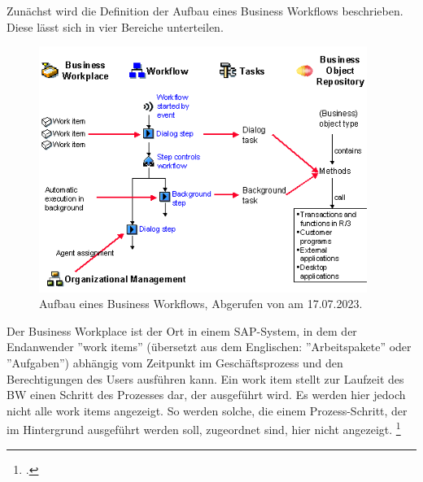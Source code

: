 Zunächst wird die Definition der Aufbau eines Business Workflows beschrieben. Diese lässt sich in vier Bereiche unterteilen.

\begin{figure}[H]
    \centering
    \includegraphics[height=8cm]{Bilder/Business-Workflows_Schema.png}
    \caption[Aufbau eines Business Workflows]{Aufbau eines Business Workflows, Abgerufen von \cite{sap_business-workflows_2022-1} am 17.07.2023.}
    \label{fig:iso_norm}
\end{figure}

Der Business Workplace ist der Ort in einem SAP-System, in dem der Endanwender ''work items'' (übersetzt aus dem Englischen: ''Arbeitspakete'' oder ''Aufgaben'') abhängig vom Zeitpunkt im Geschäftsprozess und den Berechtigungen des Users ausführen kann. Ein work item stellt zur Laufzeit des BW einen Schritt des Prozesses dar, der ausgeführt wird. Es werden hier jedoch nicht alle work items angezeigt. So werden \zB solche, die einem Prozess-Schritt, der im Hintergrund ausgeführt werden soll, zugeordnet sind, hier nicht angezeigt. \footcite[Vgl.][]{sap_business-workflows_2022-1}

